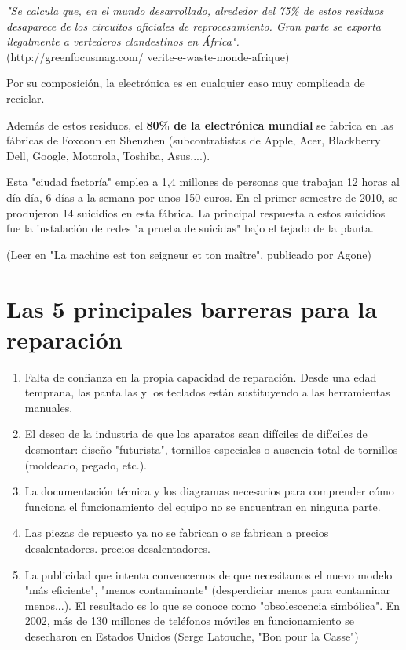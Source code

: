 \textit{"Se calcula que, en el mundo desarrollado, alrededor del 75\% de estos residuos desaparece de los circuitos oficiales de reprocesamiento. Gran parte se exporta ilegalmente a vertederos clandestinos en África".
}\\
(http://greenfocusmag.com/ verite-e-waste-monde-afrique)

Por su composición, la electrónica es en cualquier caso muy complicada de reciclar.

Además de estos residuos, el \textbf{80\% de la electrónica mundial} se fabrica
en las fábricas de Foxconn en Shenzhen (subcontratistas de Apple, Acer, Blackberry
Dell, Google, Motorola, Toshiba, Asus....).

Esta "ciudad factoría" emplea a 1,4 millones de personas que trabajan 12 horas al día
día, 6 días a la semana por unos 150 euros.
En el primer semestre de 2010, se produjeron 14 suicidios en esta
fábrica. La principal respuesta a estos suicidios fue la instalación de redes "a prueba de suicidas" bajo el tejado de la planta.

(Leer en "La machine est ton seigneur et ton maître", publicado por Agone)

\section{Las 5 principales barreras para la reparación}
\begin{enumerate}
\item Falta de confianza en la propia capacidad de reparación.
Desde una edad temprana, las pantallas y los teclados están sustituyendo a las herramientas manuales.
\item El deseo de la industria de que los aparatos sean difíciles de
difíciles de desmontar: diseño "futurista", tornillos especiales o ausencia total de tornillos (moldeado, pegado, etc.).
\item La documentación técnica y los diagramas necesarios para comprender cómo funciona el
funcionamiento del equipo no se encuentran en ninguna parte.
\item Las piezas de repuesto ya no se fabrican o se fabrican a precios desalentadores.
precios desalentadores.
\item La publicidad que intenta convencernos de que necesitamos el nuevo modelo "más eficiente", "menos contaminante" (desperdiciar menos para contaminar menos...).
El resultado es lo que se conoce como "obsolescencia simbólica".
En 2002, más de 130 millones de teléfonos móviles en funcionamiento
se desecharon en Estados Unidos (Serge Latouche, "Bon pour la
Casse")
\end{enumerate}

